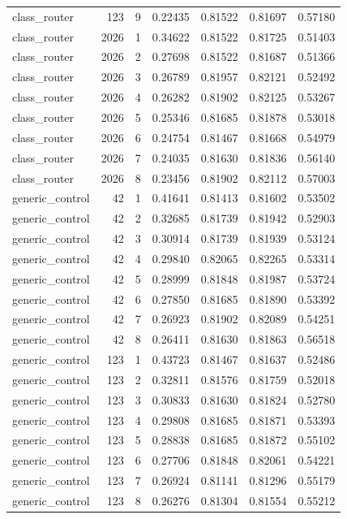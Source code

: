\begin{tabular}{lrrrrrr}
class_router & 123 & 9 & 0.22435 & 0.81522 & 0.81697 & 0.57180 \\
class_router & 2026 & 1 & 0.34622 & 0.81522 & 0.81725 & 0.51403 \\
class_router & 2026 & 2 & 0.27698 & 0.81522 & 0.81687 & 0.51366 \\
class_router & 2026 & 3 & 0.26789 & 0.81957 & 0.82121 & 0.52492 \\
class_router & 2026 & 4 & 0.26282 & 0.81902 & 0.82125 & 0.53267 \\
class_router & 2026 & 5 & 0.25346 & 0.81685 & 0.81878 & 0.53018 \\
class_router & 2026 & 6 & 0.24754 & 0.81467 & 0.81668 & 0.54979 \\
class_router & 2026 & 7 & 0.24035 & 0.81630 & 0.81836 & 0.56140 \\
class_router & 2026 & 8 & 0.23456 & 0.81902 & 0.82112 & 0.57003 \\
generic_control & 42 & 1 & 0.41641 & 0.81413 & 0.81602 & 0.53502 \\
generic_control & 42 & 2 & 0.32685 & 0.81739 & 0.81942 & 0.52903 \\
generic_control & 42 & 3 & 0.30914 & 0.81739 & 0.81939 & 0.53124 \\
generic_control & 42 & 4 & 0.29840 & 0.82065 & 0.82265 & 0.53314 \\
generic_control & 42 & 5 & 0.28999 & 0.81848 & 0.81987 & 0.53724 \\
generic_control & 42 & 6 & 0.27850 & 0.81685 & 0.81890 & 0.53392 \\
generic_control & 42 & 7 & 0.26923 & 0.81902 & 0.82089 & 0.54251 \\
generic_control & 42 & 8 & 0.26411 & 0.81630 & 0.81863 & 0.56518 \\
generic_control & 123 & 1 & 0.43723 & 0.81467 & 0.81637 & 0.52486 \\
generic_control & 123 & 2 & 0.32811 & 0.81576 & 0.81759 & 0.52018 \\
generic_control & 123 & 3 & 0.30833 & 0.81630 & 0.81824 & 0.52780 \\
generic_control & 123 & 4 & 0.29808 & 0.81685 & 0.81871 & 0.53393 \\
generic_control & 123 & 5 & 0.28838 & 0.81685 & 0.81872 & 0.55102 \\
generic_control & 123 & 6 & 0.27706 & 0.81848 & 0.82061 & 0.54221 \\
generic_control & 123 & 7 & 0.26924 & 0.81141 & 0.81296 & 0.55179 \\
generic_control & 123 & 8 & 0.26276 & 0.81304 & 0.81554 & 0.55212 \\

\end{tabular}
